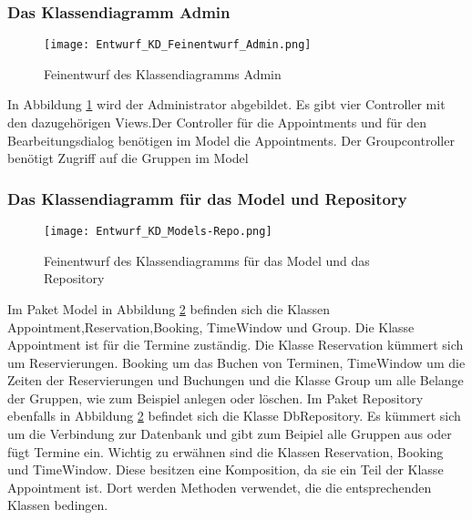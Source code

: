 \documentclass[a4paper,10pt]{article}
\begin{document}
 \subsubsection{Das Klassendiagramm Admin}
 \begin{figure}
  \texttt{[image: Entwurf\_KD\_Feinentwurf\_Admin.png]}
  \label{fig:Klassendiagramm_Admin}
  \caption{Feinentwurf des Klassendiagramms Admin}
 \end{figure} 

 In Abbildung \ref{fig:Klassendiagramm_Admin} wird der Administrator abgebildet. Es gibt vier Controller mit den dazugehörigen Views.Der Controller für die Appointments und für den Bearbeitungsdialog benötigen im Model die Appointments. Der Groupcontroller benötigt Zugriff auf die Gruppen im Model
 \subsubsection{Das Klassendiagramm für das Model und Repository}
 
 \begin{figure}
  \texttt{[image: Entwurf\_KD\_Models-Repo.png]}
  \label{fig:Klassendiagramm_Models-Repo}
\caption{Feinentwurf des Klassendiagramms für das Model und das Repository}
 \end{figure} 

Im Paket Model in Abbildung \ref{fig:Klassendiagramm_Models-Repo} befinden sich die Klassen Appointment,Reservation,Booking, TimeWindow und Group. Die Klasse Appointment ist für die Termine zuständig. Die Klasse Reservation kümmert sich um Reservierungen. Booking um das Buchen von Terminen, TimeWindow um die Zeiten der Reservierungen und Buchungen und die Klasse Group um alle Belange der Gruppen, wie zum Beispiel anlegen oder löschen.
Im Paket Repository ebenfalls in Abbildung \ref{fig:Klassendiagramm_Models-Repo} befindet sich die Klasse DbRepository. Es kümmert sich um die Verbindung zur Datenbank und gibt zum Beipiel alle Gruppen aus oder fügt Termine ein.
Wichtig zu erw\"ahnen sind die Klassen Reservation, Booking und TimeWindow. Diese besitzen eine Komposition, da sie ein Teil der Klasse Appointment ist. Dort werden Methoden verwendet, die die entsprechenden Klassen bedingen.
\end{document}
